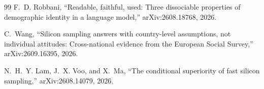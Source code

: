 \documentclass[conference]{IEEEtran}
\begin{document}
\begin{thebibliography}{99}
F.~D. Robbani, ``Readable, faithful, used: Three dissociable properties of demographic identity in a language model,'' arXiv:2608.18768, 2026.

C.~Wang, ``Silicon sampling answers with country-level assumptions, not individual attitudes: Cross-national evidence from the European Social Survey,'' arXiv:2609.16395, 2026.

N.~H.~Y. Lam, J.~X. Voo, and X.~Ma, ``The conditional superiority of fast silicon sampling,'' arXiv:2608.14079, 2026.

\end{thebibliography}
\end{document}
